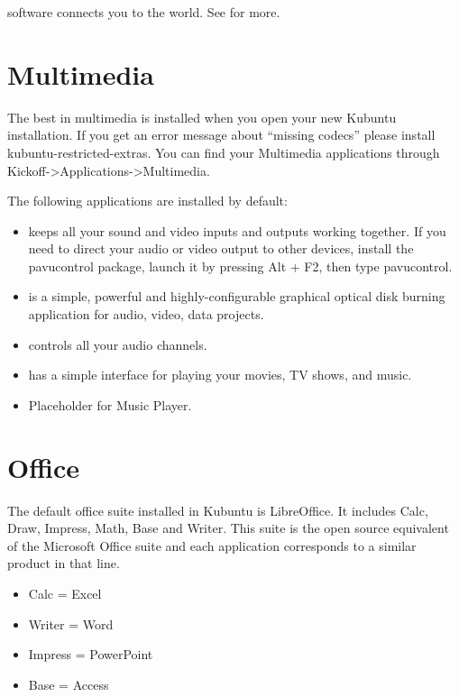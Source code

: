 \documentclass[letterpaper,10pt,english]{sphinxmanual}
\begin{document}
 software connects you to the world. See  for more.


\section{Multimedia}
\label{\detokenize{docs/software:multimedia}}
The best in multimedia is installed when you open your new Kubuntu installation. If you get an error message about “missing codecs” please install kubuntu-restricted-extras. You can find your Multimedia applications through Kickoff-\textgreater{}Applications-\textgreater{}Multimedia.

The following applications are installed by default:
\begin{itemize}
\item {} 
 keeps all your sound and video inputs and outputs working together. If you need to direct your audio or video output to other devices, install the pavucontrol package, launch it by pressing Alt + F2, then type pavucontrol.

\item {} 
 is a simple, powerful and highly-configurable graphical optical disk burning application for audio, video, data projects.

\item {} 
 controls all your audio channels.

\item {} 
 has a simple interface for playing your movies, TV shows, and music.

\item {} 
Placeholder for Music Player.

\end{itemize}


\section{Office}
\label{\detokenize{docs/software:office}}
The default office suite installed in Kubuntu is LibreOffice. It includes Calc, Draw, Impress, Math, Base and Writer. This suite is the open source equivalent of the Microsoft Office suite and each application corresponds to a similar product in that line.
\begin{itemize}
\item {} 
Calc = Excel

\item {} 
Writer = Word

\item {} 
Impress = PowerPoint

\item {} 
Base = Access

\end{itemize}
\end{document}
